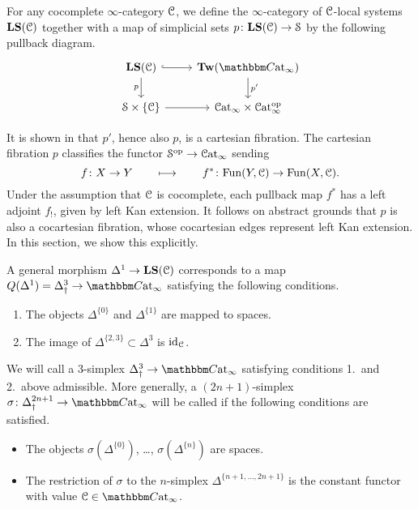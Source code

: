 \documentclass[main.tex]{subfiles}
\begin{document}
\begin{definition}
  For any cocomplete $\infty$-category $\mathcal{C}$, we define the $\infty$-category of $\mathcal{C}$-local systems $\mathbf{LS}(\mathcal{C})$ together with a map of simplicial sets $p\colon \mathbf{LS}(\mathcal{C}) \to \mathcal{S}$ by the following pullback diagram.
  \begin{equation*}
    \begin{tikzcd}
      \LS(\category{C})
      \arrow[r, hook]
      \arrow[d, swap, "p"]
      & \Tw(\ICCat)
      \arrow[d, "p'"]
      \\
      \S \times \{\category{C}\}
      \arrow[r]
      & \ICat \times \ICat\op
    \end{tikzcd}
  \end{equation*}
\end{definition}

It is shown in \cite{garcia2020enhanced} that $p'$, hence also $p$, is a cartesian fibration. The cartesian fibration $p$ classifies the functor $\mathcal{S}^{\mathrm{op}} \to \mathcal{C}\mathrm{at}_{\infty}$ sending
\begin{equation*}
  f\colon X \to Y \qquad \longmapsto \qquad f^{*}\colon \mathrm{Fun}(Y, \mathcal{C}) \to \mathrm{Fun}(X, \mathcal{C}).
\end{equation*}
Under the assumption that $\mathcal{C}$ is cocomplete, each pullback map $f^{*}$ has a left adjoint $f_{!}$, given by left Kan extension. It follows on abstract grounds that $p$ is also a cocartesian fibration, whose cocartesian edges represent left Kan extension. In this section, we show this explicitly.

A general morphism $\Delta^{1} \to \mathbf{LS}(\mathcal{C})$ corresponds to a map $Q(\Delta^{1}) = \Delta^{3}_{\dagger} \to \ICCat$ satisfying the following conditions.
\begin{enumerate}
  \item The objects $\Delta^{\{0\}}$ and $\Delta^{\{1\}}$ are mapped to spaces.

  \item The image of $\Delta^{\{2,3\}} \subset \Delta^{3}$ is $\mathrm{id}_{\mathcal{C}}$.
\end{enumerate}

\begin{definition}
  \label{def:admissible}
  We will call a 3-simplex $\Delta^{3}_{\dagger} \to \ICCat$ satisfying conditions 1.\ and 2.\ above admissible. More generally, a $(2n+1)$-simplex $\sigma\colon \Delta^{2n+1}_{\dagger} \to \ICCat$ will be called  if the following conditions are satisfied.
  \begin{itemize}
    \item The objects $\sigma(\Delta^{\{0\}})$, \dots, $\sigma(\Delta^{\{n\}})$ are spaces.

    \item The restriction of $\sigma$ to the $n$-simplex $\Delta^{\{n+1, \ldots, 2n+1\}}$ is the constant functor with value $\category{C} \in \ICCat$.
  \end{itemize}
\end{definition}
\end{document}
